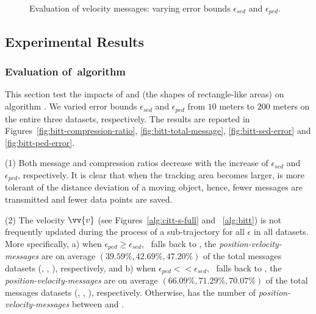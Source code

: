 {{\begin{figure}[tb!]
	\vspace{-1ex}
	\caption{\small Evaluation of velocity messages: varying error bounds $\epsilon_{sed}$ and $\epsilon_{ped}$.}
	\label{fig:speed-message}
	\vspace{-1ex}
\end{figure}
}%



\subsection{Experimental Results}

\subsubsection{Evaluation of~algorithm \bitt}
This section test the impacts of \ped and \sed (\ie the shapes of rectangle-like areas) on algorithm \bitt. We varied error bounds $\epsilon_{sed}$ and $\epsilon_{ped}$ from $10$ meters to $200$ meters on the entire three datasets, respectively. The results are reported in Figures~\ref{fig:bitt-compression-ratio}, \ref{fig:bitt-total-message}, \ref{fig:bitt-sed-error} and \ref{fig:bitt-ped-error}.


\ni (1) Both message and compression ratios decrease with the increase of $\epsilon_{sed}$ and $\epsilon_{ped}$, respectively. It is clear that when the tracking area becomes larger, \bitt is more tolerant of the distance deviation of a moving object, hence, fewer messages are transmitted and fewer data points are saved.

\ni (2) The velocity  $\vv{v}$ (see Figures~\ref{alg:citt-s-full} and ~\ref{alg:bitt}) is not frequently updated during the process of a sub-trajectory for all $\epsilon$ in all datasets. More specifically, a) when $\epsilon_{ped} \ge \epsilon_{sed}$, \ie~\bitt falls back to \citt, the \emph{position-velocity-messages} are on average $(39.59\%, 42.69\%, 47.20\%)$ of the total messages \wrt datasets (\mopsi, \sercar, \geolife), respectively, and b) when $\epsilon_{ped} << \epsilon_{sed}$, \ie~\bitt falls back to \sitt, the \emph{position-velocity-messages} are on average $(66.09\%, 71.29\%, 70.07\%)$ of the total messages \wrt datasets (\mopsi, \sercar, \geolife), respectively. Otherwise, \bitt has the number of \emph{position-velocity-messages} between \citt and \sitt.

}
